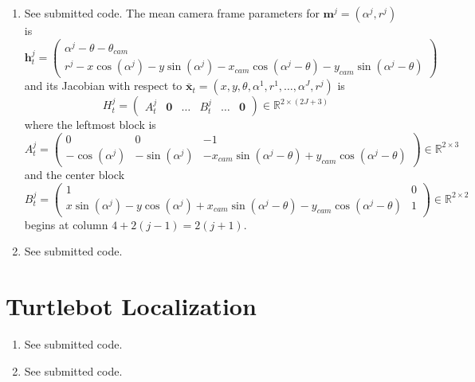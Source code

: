 \documentclass[12pt]{article}
\begin{document}
\begin{enumerate}
\begin{align*}
\begin{array}{cccccccc}
		\vdots & \vdots & \vdots & \vdots & \vdots & \ddots & \vdots & \vdots \\
		0 & 0 & 0 & 0 & 0 & \ldots & 1 & 0 \\
		0 & 0 & 0 & 0 & 0 & \ldots & 0 & 1
		\end{array}\right) \\
		G_u = \frac{1}{\omega_t}&\left(\begin{array}{cc}
		\sin(\theta_t) - \sin(\theta_{t-1}) & -\frac{V_t}{\omega_t}(\sin(\theta_t) - \sin(\theta_{t-1})) + V_t\cos(\theta_t)dt \\
		-\cos(\theta_t) + \cos(\theta_{t-1}) & \frac{V_t}{\omega_t}(\cos(\theta_t) - \cos(\theta_{t-1})) + V_t\sin(\theta_t)dt \\
		0 & \omega_tdt \\
		0 & dt \\
		0 & 0 \\
		0 & 0 \\
		\vdots & \vdots \\
		0 & 0 \\
		0 & 0
		\end{array}\right).
	\end{align*}
	where $\theta_t := \theta_{t-1} + \omega_tdt$.
	\item See submitted code. The mean camera frame parameters for $\mathbf{m}^j = (\alpha^j, r^j)$ is
	\[
		\mathbf{h}_t^j = \left(\begin{array}{c}
		\alpha^j - \theta - \theta_{cam} \\
		r^j - x\cos(\alpha^j) - y\sin(\alpha^j) - x_{cam}\cos(\alpha^j - \theta) - y_{cam}\sin(\alpha^j - \theta)
		\end{array}\right)
	\]
	and its Jacobian with respect to $\bar{\mathbf{x}}_t = (x,y,\theta,\alpha^1,r^1,\ldots, \alpha^J,r^j)$ is
	\[
		H_t^j = \left(\begin{array}{cccccc}
		A_t^j & \mathbf{0} & \ldots & B_t^j & \ldots & \mathbf{0}
		\end{array}\right) \in \mathbb{R}^{2 \times (2J + 3)}
	\]
	where the leftmost block is
	\[
		A_t^j = \left(\begin{array}{ccc}
			0 & 0 & -1 \\
			-\cos(\alpha^j) & -\sin(\alpha^j) & -x_{cam}\sin(\alpha^j - \theta) + y_{cam}\cos(\alpha^j - \theta)
		\end{array}\right) \in \mathbb{R}^{2 \times 3}
	\]
	and the center block
	\[
		B_t^j = \left(\begin{array}{cc}
			1 & 0 \\
			x\sin(\alpha^j) - y\cos(\alpha^j) + x_{cam}\sin(\alpha^j - \theta) -y_{cam}\cos(\alpha^j - \theta) & 1
		\end{array}\right) \in \mathbb{R}^{2 \times 2}
	\]
	begins at column $4 + 2(j-1) = 2(j+1)$.
	\item See submitted code.
\end{enumerate}

\section{Turtlebot Localization}
\begin{enumerate}
	\item See submitted code.
	\item See submitted code.
\end{enumerate}
\end{document}
